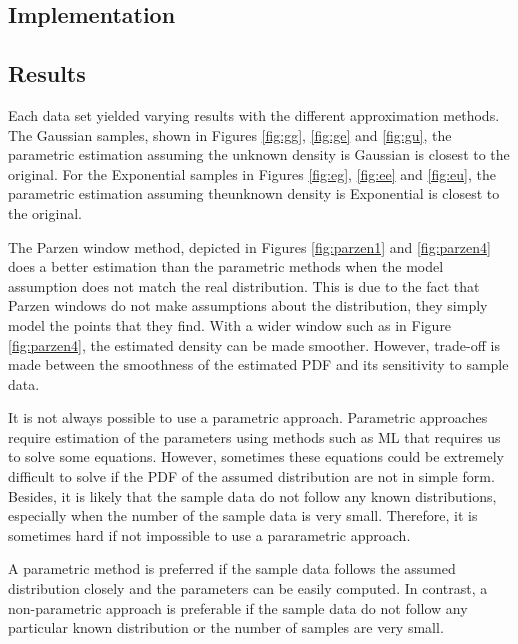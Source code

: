 \label{sec:1d}
\subsection{Implementation}


\subsection{Results}
Each data set yielded varying results with the different approximation methods.
The Gaussian samples, shown in Figures \ref{fig:gg}, \ref{fig:ge} and
\ref{fig:gu}, the parametric estimation assuming the unknown density is
Gaussian is closest to the original. For the Exponential samples in Figures
\ref{fig:eg}, \ref{fig:ee} and \ref{fig:eu}, the
parametric estimation assuming theunknown density is Exponential is closest to the original.

The Parzen window method, depicted in Figures \ref{fig:parzen1} and \ref{fig:parzen4} does a
better estimation than the parametric methods when the model assumption does
not match the real distribution. This is due to the fact that Parzen windows do
not make assumptions about the distribution, they simply model the points that
they find. With a wider window such as in Figure \ref{fig:parzen4}, the estimated density
can be made smoother. However, trade-off is made between the smoothness of the estimated PDF and its
sensitivity to sample data.

It is not always possible to use a parametric approach. Parametric
approaches require estimation of the parameters using methods such as ML that
requires us to solve some equations. However, sometimes these equations could
be extremely difficult to solve if the PDF of the assumed distribution are not
in simple form. Besides, it is likely that the sample data do not follow any
known distributions, especially when the number of the sample data is very
small. Therefore, it is sometimes hard if not impossible to use a pararametric approach.

A parametric method is preferred if the sample data follows the assumed
distribution closely and the parameters can be easily computed. In contrast, a
non-parametric approach is preferable if the sample data do not follow any
particular known distribution or the number of samples are very small.


